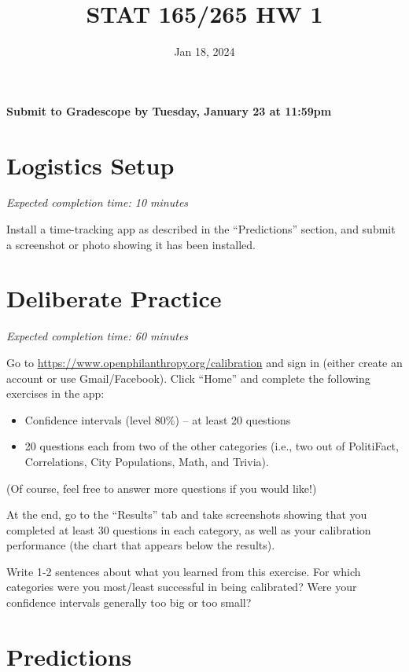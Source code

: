 \documentclass[11pt]{article}
\title{STAT 165/265 HW 1}
\date{Jan 18, 2024}
\begin{document}
\maketitle

\hfill \textbf{Submit to Gradescope by Tuesday, January 23 at 11:59pm}

\section*{Logistics Setup}

\emph{Expected completion time: 10 minutes}

Install a time-tracking app as described in the ``Predictions'' section, and submit a screenshot or photo showing it has been 
installed.

\section*{Deliberate Practice}

\emph{Expected completion time: 60 minutes}

Go to \url{https://www.openphilanthropy.org/calibration} and sign in (either create an account or use 
Gmail/Facebook). Click ``Home'' and complete the following exercises in the app:

\begin{itemize}

\item Confidence intervals (level 80\%) -- at least 20 questions
\item 20 questions each from two of the other categories (i.e., two out of PolitiFact, Correlations, City Populations, Math, and Trivia).

\end{itemize}

(Of course, feel free to answer more questions if you would like!)

At the end, go to the ``Results'' tab and take screenshots showing that 
you completed at least 30 questions in each category, as well as your calibration 
performance (the chart that appears below the results).

Write 1-2 sentences about what you learned from this exercise. For which categories were you most/least successful in being calibrated? Were your confidence intervals generally too big or too small? 

\section*{Predictions}
\end{document}
